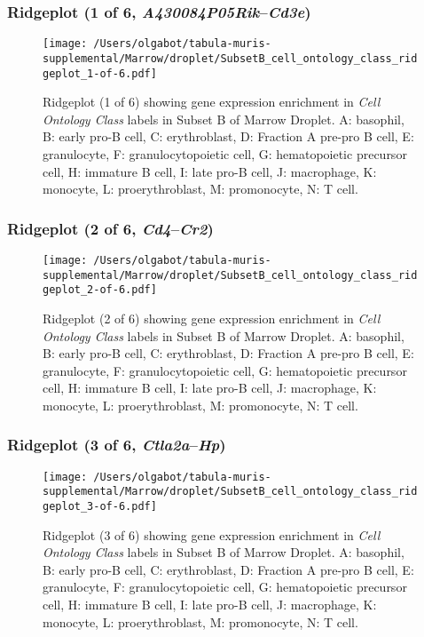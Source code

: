 \clearpage

\subsubsection{Ridgeplot (1 of 6, \emph{A430084P05Rik}--\emph{Cd3e})}
\begin{figure}[h]
\centering
\texttt{[image: /Users/olgabot/tabula-muris-supplemental/Marrow/droplet/SubsetB\_cell\_ontology\_class\_ridgeplot\_1-of-6.pdf]}

\caption{ Ridgeplot (1 of 6)  showing gene expression enrichment in \emph{Cell Ontology Class} labels in Subset B of Marrow Droplet. A: basophil, B: early pro-B cell, C: erythroblast, D: Fraction A pre-pro B cell, E: granulocyte, F: granulocytopoietic cell, G: hematopoietic precursor cell, H: immature B cell, I: late pro-B cell, J: macrophage, K: monocyte, L: proerythroblast, M: promonocyte, N: T cell.}
\end{figure}


\clearpage

\subsubsection{Ridgeplot (2 of 6, \emph{Cd4}--\emph{Cr2})}
\begin{figure}[h]
\centering
\texttt{[image: /Users/olgabot/tabula-muris-supplemental/Marrow/droplet/SubsetB\_cell\_ontology\_class\_ridgeplot\_2-of-6.pdf]}

\caption{ Ridgeplot (2 of 6)  showing gene expression enrichment in \emph{Cell Ontology Class} labels in Subset B of Marrow Droplet. A: basophil, B: early pro-B cell, C: erythroblast, D: Fraction A pre-pro B cell, E: granulocyte, F: granulocytopoietic cell, G: hematopoietic precursor cell, H: immature B cell, I: late pro-B cell, J: macrophage, K: monocyte, L: proerythroblast, M: promonocyte, N: T cell.}
\end{figure}


\clearpage

\subsubsection{Ridgeplot (3 of 6, \emph{Ctla2a}--\emph{Hp})}
\begin{figure}[h]
\centering
\texttt{[image: /Users/olgabot/tabula-muris-supplemental/Marrow/droplet/SubsetB\_cell\_ontology\_class\_ridgeplot\_3-of-6.pdf]}

\caption{ Ridgeplot (3 of 6)  showing gene expression enrichment in \emph{Cell Ontology Class} labels in Subset B of Marrow Droplet. A: basophil, B: early pro-B cell, C: erythroblast, D: Fraction A pre-pro B cell, E: granulocyte, F: granulocytopoietic cell, G: hematopoietic precursor cell, H: immature B cell, I: late pro-B cell, J: macrophage, K: monocyte, L: proerythroblast, M: promonocyte, N: T cell.}
\end{figure}


